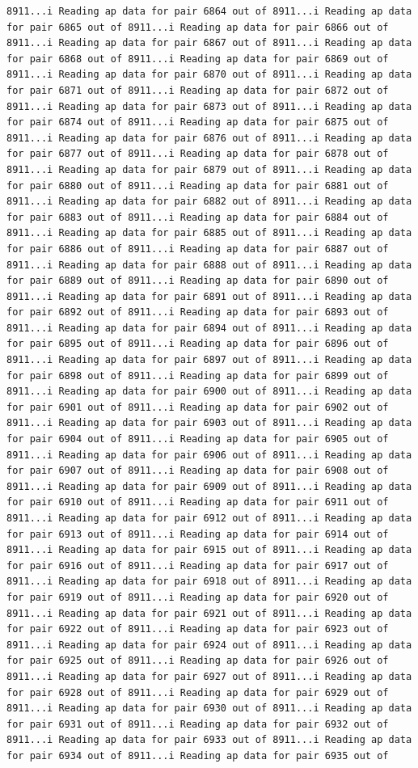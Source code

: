 \documentclass[
]{article}
\begin{document}
\begin{verbatim}
8911...i Reading ap data for pair 6864 out of 8911...i Reading ap data for pair 6865 out of 8911...i Reading ap data for pair 6866 out of 8911...i Reading ap data for pair 6867 out of 8911...i Reading ap data for pair 6868 out of 8911...i Reading ap data for pair 6869 out of 8911...i Reading ap data for pair 6870 out of 8911...i Reading ap data for pair 6871 out of 8911...i Reading ap data for pair 6872 out of 8911...i Reading ap data for pair 6873 out of 8911...i Reading ap data for pair 6874 out of 8911...i Reading ap data for pair 6875 out of 8911...i Reading ap data for pair 6876 out of 8911...i Reading ap data for pair 6877 out of 8911...i Reading ap data for pair 6878 out of 8911...i Reading ap data for pair 6879 out of 8911...i Reading ap data for pair 6880 out of 8911...i Reading ap data for pair 6881 out of 8911...i Reading ap data for pair 6882 out of 8911...i Reading ap data for pair 6883 out of 8911...i Reading ap data for pair 6884 out of 8911...i Reading ap data for pair 6885 out of 8911...i Reading ap data for pair 6886 out of 8911...i Reading ap data for pair 6887 out of 8911...i Reading ap data for pair 6888 out of 8911...i Reading ap data for pair 6889 out of 8911...i Reading ap data for pair 6890 out of 8911...i Reading ap data for pair 6891 out of 8911...i Reading ap data for pair 6892 out of 8911...i Reading ap data for pair 6893 out of 8911...i Reading ap data for pair 6894 out of 8911...i Reading ap data for pair 6895 out of 8911...i Reading ap data for pair 6896 out of 8911...i Reading ap data for pair 6897 out of 8911...i Reading ap data for pair 6898 out of 8911...i Reading ap data for pair 6899 out of 8911...i Reading ap data for pair 6900 out of 8911...i Reading ap data for pair 6901 out of 8911...i Reading ap data for pair 6902 out of 8911...i Reading ap data for pair 6903 out of 8911...i Reading ap data for pair 6904 out of 8911...i Reading ap data for pair 6905 out of 8911...i Reading ap data for pair 6906 out of 8911...i Reading ap data for pair 6907 out of 8911...i Reading ap data for pair 6908 out of 8911...i Reading ap data for pair 6909 out of 8911...i Reading ap data for pair 6910 out of 8911...i Reading ap data for pair 6911 out of 8911...i Reading ap data for pair 6912 out of 8911...i Reading ap data for pair 6913 out of 8911...i Reading ap data for pair 6914 out of 8911...i Reading ap data for pair 6915 out of 8911...i Reading ap data for pair 6916 out of 8911...i Reading ap data for pair 6917 out of 8911...i Reading ap data for pair 6918 out of 8911...i Reading ap data for pair 6919 out of 8911...i Reading ap data for pair 6920 out of 8911...i Reading ap data for pair 6921 out of 8911...i Reading ap data for pair 6922 out of 8911...i Reading ap data for pair 6923 out of 8911...i Reading ap data for pair 6924 out of 8911...i Reading ap data for pair 6925 out of 8911...i Reading ap data for pair 6926 out of 8911...i Reading ap data for pair 6927 out of 8911...i Reading ap data for pair 6928 out of 8911...i Reading ap data for pair 6929 out of 8911...i Reading ap data for pair 6930 out of 8911...i Reading ap data for pair 6931 out of 8911...i Reading ap data for pair 6932 out of 8911...i Reading ap data for pair 6933 out of 8911...i Reading ap data for pair 6934 out of 8911...i Reading ap data for pair 6935 out of 
\end{verbatim}
\end{document}
